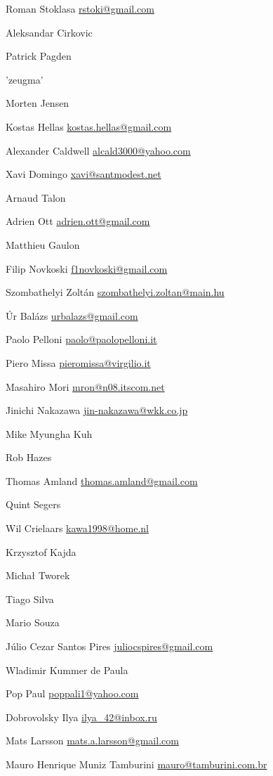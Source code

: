 \item Roman Stoklasa \url{rstoki@gmail.com}
\item*Aleksandar Cirkovic
\item*Patrick Pagden
\item 'zeugma'
\item Morten Jensen
\item Kostas Hellas \url{kostas.hellas@gmail.com}
\item Alexander Caldwell \url{alcald3000@yahoo.com}
\item Xavi Domingo \url{xavi@santmodest.net}
\item Arnaud Talon
\item Adrien Ott \url{adrien.ott@gmail.com}
\item Matthieu Gaulon
\item Filip Novkoski \url{f1novkoski@gmail.com}
\item Szombathelyi Zolt\'an \url{szombathelyi.zoltan@main.hu}
\item \'Ur Bal\'azs \url{urbalazs@gmail.com}
\item Paolo Pelloni \url{paolo@paolopelloni.it}
\item Piero Missa \url{pieromissa@virgilio.it}
\item Masahiro Mori \url{mron@n08.itscom.net}
\item Jinichi Nakazawa \url{jin-nakazawa@wkk.co.jp}
\item Mike Myungha Kuh
\item Rob Hazes
\item Thomas Amland \url{thomas.amland@gmail.com}
\item Quint Segers
\item Wil Crielaars \url{kawa1998@home.nl}
\item Krzysztof Kajda
\item Michał Tworek
\item Tiago Silva
\item Mario Souza
\item J\'ulio Cezar Santos Pires \url{juliocspires@gmail.com}
\item Wladimir Kummer de Paula
\item Pop Paul \url{poppali1@yahoo.com}
\item Dobrovolsky Ilya \url{ilya_42@inbox.ru}
\item Mats Larsson \url{mats.a.larsson@gmail.com}
\item Mauro Henrique Muniz Tamburini \url {mauro@tamburini.com.br}
